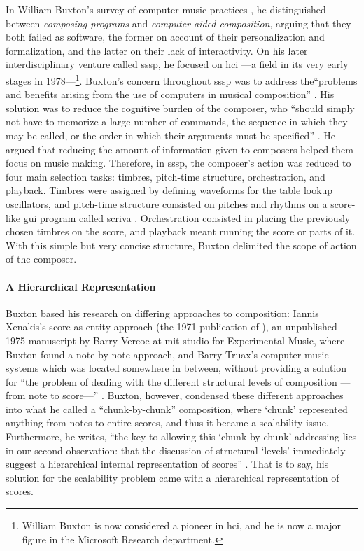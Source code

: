 	In William Buxton's survey of computer music practices \parencite{Bux77:Aco, icmc/bbp2372.1978.012, DBLP:conf/icmc/BuxtonPRB80}, he distinguished between \textit{composing programs} and \textit{computer aided composition}, arguing that they both failed as software, the former on account of their personalization and formalization, and the latter on their lack of interactivity. On his later interdisciplinary venture called \gls{sssp}, he focused on \gls{hci} ---a field in its very early stages in 1978---\footnote{William Buxton is now considered a pioneer in \gls{hci}, and he is now a major figure in the Microsoft Research department.}. Buxton's concern throughout \gls{sssp} was to address the``problems and benefits arising from the use of computers in musical composition'' \parencite[472]{DBLP:conf/icmc/BuxtonFBRSCM78}. His solution was to reduce the cognitive burden of the composer, who ``should simply not have to memorize a large number of commands, the sequence in which they may be called, or the order in which their arguments must be specified'' \parencite[474]{DBLP:conf/icmc/BuxtonFBRSCM78}. He argued that reducing the amount of information given to composers helped them focus on music making. Therefore, in \gls{sssp}, the composer's action was reduced to four main selection tasks: timbres, pitch-time structure, orchestration, and playback. Timbres were assigned by defining waveforms for the table lookup oscillators, and pitch-time structure consisted on pitches and rhythms on a score-like \gls{gui} program called \gls{scriva} \parencite{youtube/buxton10}. Orchestration consisted in placing the previously chosen timbres on the score, and playback meant running the score or parts of it. With this simple but very concise structure, Buxton delimited the scope of action of the composer.

	\paragraph{A Hierarchical Representation}

	Buxton based his research on differing approaches to composition: Iannis Xenakis's score-as-entity approach \parencite{Xen92:For} (the 1971 publication of ), an unpublished 1975 manuscript by Barry Vercoe at \gls{mit} studio for Experimental Music, where Buxton found a note-by-note approach, and Barry Truax's computer music systems \parencite{Tru73:The} which was located somewhere in between, without providing a solution for ``the problem of dealing with the different structural levels of composition ---from note to score---'' \parencite[120]{icmc/bbp2372.1978.012} . Buxton, however, condensed these different approaches into what he called a ``chunk-by-chunk'' composition, where `chunk' represented anything from notes to entire scores, and thus it became a scalability issue. Furthermore, he writes, ``the key to allowing this `chunk-by-chunk' addressing lies in our second observation: that the discussion of structural `levels' immediately suggest a hierarchical internal representation of scores'' \parencite[120]{icmc/bbp2372.1978.012}. That is to say, his solution for the scalability problem came with a hierarchical representation of scores. 

